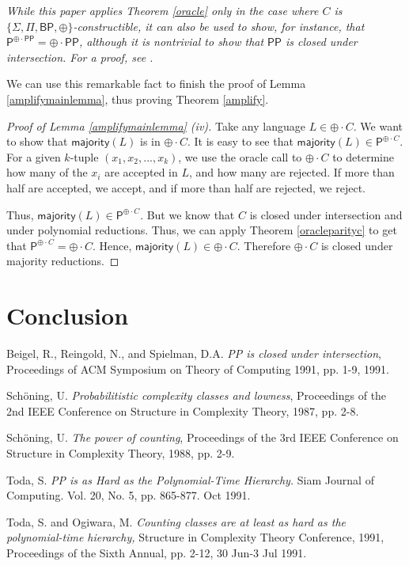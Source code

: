 \documentclass[11pt]{article}
\newcommand{\bp}{\textsf{BP}}
\newcommand{\parity}{\oplus}
\newcommand{\p}{\textsf{P}}
\newcommand{\pp}{\textsf{PP}}
\newcommand{\majority}{\textsf{majority}}
\begin{document}
\begin{remark}\emph{
While this paper applies Theorem \ref{oracle} only in the case where $C$ is $\{\Sigma,\Pi,\bp,\parity\}$-constructible, it can also be used to show, for instance, that $\p^{\parity \cdot \pp} = \parity \cdot \pp$, although it is nontrivial to show that $\pp$ is closed under intersection. For a proof, see \cite{Beigel}.
}\end{remark}

We can use this remarkable fact to finish the proof of Lemma \ref{amplifymainlemma}, thus proving Theorem \ref{amplify}.
\begin{proof}[Proof of Lemma \ref{amplifymainlemma} (iv)]
Take any language $L \in \parity \cdot C$. We want to show that $\majority(L)$ is in $\parity \cdot C$. It is easy to see that $\majority(L) \in \p^{\parity \cdot C}$. For a given $k$-tuple $(x_1,x_2,...,x_k)$, we use the oracle call to $\parity \cdot C$ to determine how many of the $x_i$ are accepted in $L$, and how many are rejected. If more than half are accepted, we accept, and if more than half are rejected, we reject.

Thus, $\majority(L) \in \p^{\parity \cdot C}$. But we know that $C$ is closed under intersection and under polynomial reductions. Thus, we can apply Theorem \ref{oracleparityc} to get that $\p^{\parity \cdot C} = \parity \cdot C$. Hence, $\majority(L) \in \parity \cdot C$. Therefore $\parity \cdot C$ is closed under majority reductions.
\end{proof}

\section{Conclusion}

\pagebreak

\begin{thebibliography}{9}

 Beigel, R., Reingold, N., and Spielman, D.A. \emph{PP is closed under intersection}, Proceedings of ACM Symposium on Theory of Computing 1991, pp. 1-9, 1991.

 Sch\"oning, U. \emph{Probabilitistic complexity classes and lowness}, Proceedings of the 2nd IEEE Conference on Structure in Complexity Theory, 1987, pp. 2-8.

 Sch\"oning, U. \emph{The power of counting}, Proceedings of the 3rd IEEE Conference on Structure in Complexity Theory, 1988, pp. 2-9.

Toda, S. \emph{PP is as Hard as the Polynomial-Time Hierarchy.} Siam Journal of Computing. Vol. 20, No. 5, pp. 865-877. Oct 1991.

 Toda, S. and Ogiwara, M. \emph{Counting classes are at least as hard as the polynomial-time hierarchy,} Structure in Complexity Theory Conference, 1991, Proceedings of the Sixth Annual, pp. 2-12, 30 Jun-3 Jul 1991.

\end{thebibliography}
\end{document}
